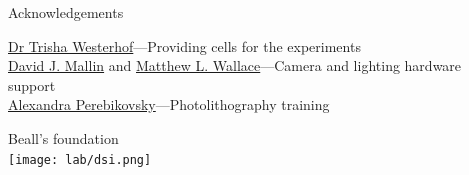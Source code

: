 \begin{frame}[c]{Acknowledgements}
	
	\underline{Dr Trisha Westerhof}---Providing cells for the experiments \\
	\vspace{.15in}
	\underline{David J. Mallin} and \underline{Matthew L. Wallace}---Camera and lighting hardware support \\
	\vspace{.15in}
	\underline{Alexandra Perebikovsky}---Photolithography training \\
	\vspace{.35in}
	
	{\centering
		{\large Beall's foundation} \\
		\vspace{0.3in}
		\texttt{[image: lab/dsi.png]} \\
		\par
	}
	
	
\end{frame}








